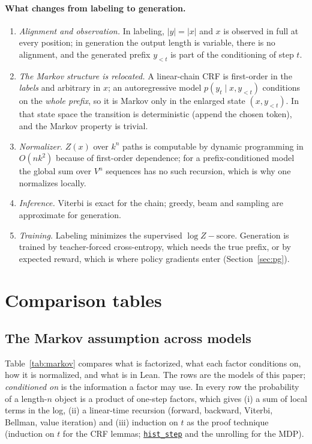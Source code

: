 \documentclass[11pt,a4paper]{article}
\newcommand{\lmod}[2]{\href{http://www.lemma.cn/lean/?module=#2}{\nolinkurl{#1}}}
\begin{document}
\paragraph{What changes from labeling to generation.}
\begin{enumerate}[leftmargin=1.6em,itemsep=0.2em]
  \item \emph{Alignment and observation.} In labeling, $|y|=|x|$ and $x$ is observed in full at every position; in generation the output length is variable, there is no alignment, and the generated prefix $y_{<t}$ is part of the conditioning of step $t$.
  \item \emph{The Markov structure is relocated.} A linear-chain CRF is first-order in the \emph{labels} and arbitrary in $x$; an autoregressive model $p(y_t\mid x,y_{<t})$ conditions on the \emph{whole prefix}, so it is Markov only in the enlarged state $(x,y_{<t})$.
  In that state space the transition is deterministic (append the chosen token), and the Markov property is trivial.
  \item \emph{Normalizer.} $Z(x)$ over $k^n$ paths is computable by dynamic programming in $O(nk^2)$ because of first-order dependence; for a prefix-conditioned model the global sum over $V^n$ sequences has no such recursion, which is why one normalizes locally.
  \item \emph{Inference.} Viterbi is exact for the chain; greedy, beam and sampling are approximate for generation.
  \item \emph{Training.} Labeling minimizes the supervised $\log Z-\mathrm{score}$. Generation is trained by teacher-forced cross-entropy, which needs the true prefix, or by expected reward, which is where policy gradients enter (Section~\ref{sec:pg}).
\end{enumerate}

\section{Comparison tables}
\label{sec:tables}

\subsection{The Markov assumption across models}
Table~\ref{tab:markov} compares what is factorized, what each factor conditions on, how it is normalized, and what is in Lean.
The rows are the models of this paper; \emph{conditioned on} is the information a factor may use.
In every row the probability of a length-$n$ object is a product of one-step factors, which gives (i) a sum of local terms in the log, (ii) a linear-time recursion (forward, backward, Viterbi, Bellman, value iteration) and (iii) induction on $t$ as the proof technique (induction on $t$ for the CRF lemmas; \lmod{hist_step}{Random.Integral.of.All_LeNorm.StronglyMeasurable.history} and the unrolling for the MDP).
\end{document}
